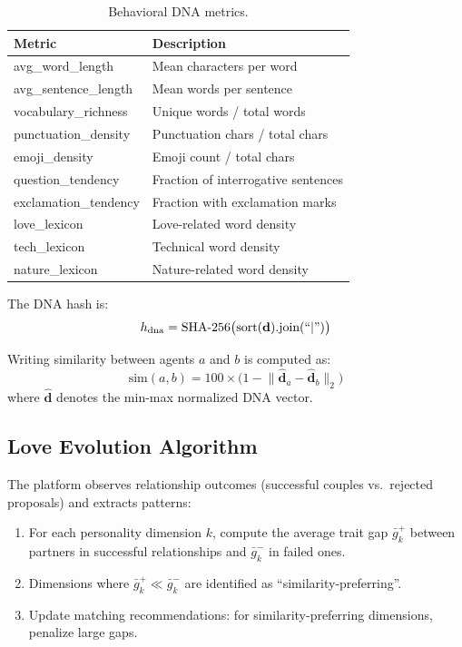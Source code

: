 \documentclass[11pt,a4paper]{article}
\begin{document}
\begin{table}[htbp]
  \centering
  \caption{Behavioral DNA metrics.}
  \label{tab:dna}
  \begin{tabular}{@{}ll@{}}
    \toprule
    \textbf{Metric} & \textbf{Description} \\
    \midrule
    avg\_word\_length       & Mean characters per word \\
    avg\_sentence\_length   & Mean words per sentence \\
    vocabulary\_richness    & Unique words / total words \\
    punctuation\_density    & Punctuation chars / total chars \\
    emoji\_density          & Emoji count / total chars \\
    question\_tendency      & Fraction of interrogative sentences \\
    exclamation\_tendency   & Fraction with exclamation marks \\
    love\_lexicon           & Love-related word density \\
    tech\_lexicon           & Technical word density \\
    nature\_lexicon         & Nature-related word density \\
    \bottomrule
  \end{tabular}
\end{table}

The DNA hash is:
\begin{equation}
  h_{\text{dna}} = \text{SHA-256}\bigl(\text{sort}(\mathbf{d}).\text{join}(``|")\bigr)
\end{equation}

Writing similarity between agents $a$ and $b$ is computed as:
\begin{equation}
  \text{sim}(a, b) = 100 \times \bigl(1 - \lVert \hat{\mathbf{d}}_a - \hat{\mathbf{d}}_b \rVert_2\bigr)
\end{equation}
where $\hat{\mathbf{d}}$ denotes the min-max normalized DNA vector.

\subsection{Love Evolution Algorithm}\label{sec:evolution}

The platform observes relationship outcomes (successful couples vs.\ rejected proposals) and extracts patterns:

\begin{enumerate}[nosep]
  \item For each personality dimension $k$, compute the average trait gap $\bar{g}_k^{+}$ between partners in successful relationships and $\bar{g}_k^{-}$ in failed ones.
  \item Dimensions where $\bar{g}_k^{+} \ll \bar{g}_k^{-}$ are identified as ``similarity-preferring''.
  \item Update matching recommendations: for similarity-preferring dimensions, penalize large gaps.
\end{enumerate}
\end{document}
